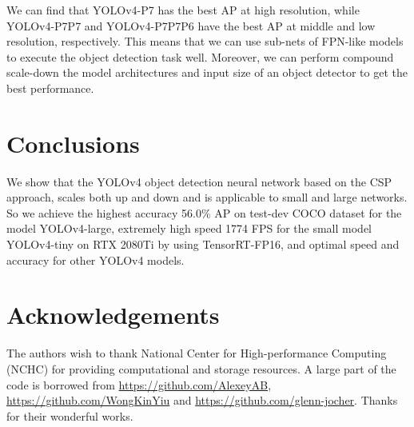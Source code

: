 \documentclass[10pt,twocolumn,letterpaper]{article}
\begin{document}
We can find that YOLOv4-P7 has the best AP at high resolution, while YOLOv4-P7P7 and YOLOv4-P7P7P6 have the best AP at middle and low resolution, respectively. This means that we can use sub-nets of FPN-like models to execute the object detection task well. Moreover, we can perform compound scale-down the model architectures and input size of an object detector to get the best performance.

\section{Conclusions}

We show that the YOLOv4 object detection neural network based on the CSP approach, scales both up and down and is applicable to small and large networks. So we achieve the highest accuracy 56.0\% AP on test-dev COCO dataset for the model YOLOv4-large, extremely high speed 1774 FPS for the small model YOLOv4-tiny on RTX 2080Ti by using TensorRT-FP16, and optimal speed and accuracy for other YOLOv4 models.

\vspace{6mm}

\section{Acknowledgements}

The authors wish to thank National Center for High-performance Computing (NCHC) for
providing computational and storage resources. A large part of the code is borrowed from \url{https://github.com/AlexeyAB}, \url{https://github.com/WongKinYiu} and \url{https://github.com/glenn-jocher}. Thanks for their wonderful works.
\end{document}
